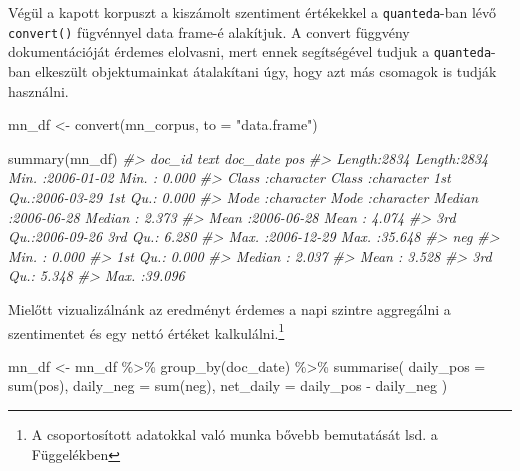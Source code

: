 \documentclass[
]{book}
\newenvironment{Shaded}{\begin{snugshade}}{\end{snugshade}}
\newcommand{\AttributeTok}[1]{\textcolor[rgb]{0.77,0.63,0.00}{#1}}
\newcommand{\CommentTok}[1]{\textcolor[rgb]{0.56,0.35,0.01}{\textit{#1}}}
\newcommand{\FunctionTok}[1]{\textcolor[rgb]{0.00,0.00,0.00}{#1}}
\newcommand{\NormalTok}[1]{#1}
\newcommand{\OtherTok}[1]{\textcolor[rgb]{0.56,0.35,0.01}{#1}}
\newcommand{\SpecialCharTok}[1]{\textcolor[rgb]{0.00,0.00,0.00}{#1}}
\newcommand{\StringTok}[1]{\textcolor[rgb]{0.31,0.60,0.02}{#1}}
\begin{document}
Végül a kapott korpuszt a kiszámolt szentiment értékekkel a
\texttt{quanteda}-ban lévő \texttt{convert()} fügvénnyel data frame-é
alakítjuk. A convert függvény dokumentációját érdemes elolvasni, mert
ennek segítségével tudjuk a \texttt{quanteda}-ban elkeszült
objektumainkat átalakítani úgy, hogy azt más csomagok is tudják
használni.

\begin{Shaded}
\begin{Highlighting}[]
\NormalTok{mn\_df }\OtherTok{\textless{}{-}} \FunctionTok{convert}\NormalTok{(mn\_corpus, }\AttributeTok{to =} \StringTok{"data.frame"}\NormalTok{)}


\FunctionTok{summary}\NormalTok{(mn\_df)}
\CommentTok{\#\textgreater{}     doc\_id              text              doc\_date               pos        }
\CommentTok{\#\textgreater{}  Length:2834        Length:2834        Min.   :2006{-}01{-}02   Min.   : 0.000  }
\CommentTok{\#\textgreater{}  Class :character   Class :character   1st Qu.:2006{-}03{-}29   1st Qu.: 0.000  }
\CommentTok{\#\textgreater{}  Mode  :character   Mode  :character   Median :2006{-}06{-}28   Median : 2.373  }
\CommentTok{\#\textgreater{}                                        Mean   :2006{-}06{-}28   Mean   : 4.074  }
\CommentTok{\#\textgreater{}                                        3rd Qu.:2006{-}09{-}26   3rd Qu.: 6.280  }
\CommentTok{\#\textgreater{}                                        Max.   :2006{-}12{-}29   Max.   :35.648  }
\CommentTok{\#\textgreater{}       neg        }
\CommentTok{\#\textgreater{}  Min.   : 0.000  }
\CommentTok{\#\textgreater{}  1st Qu.: 0.000  }
\CommentTok{\#\textgreater{}  Median : 2.037  }
\CommentTok{\#\textgreater{}  Mean   : 3.528  }
\CommentTok{\#\textgreater{}  3rd Qu.: 5.348  }
\CommentTok{\#\textgreater{}  Max.   :39.096}
\end{Highlighting}
\end{Shaded}

Mielőtt vizualizálnánk az eredményt érdemes a napi szintre aggregálni a
szentimentet és egy nettó értéket kalkulálni.\footnote{A csoportosított
  adatokkal való munka bővebb bemutatását lsd. a Függelékben}

\begin{Shaded}
\begin{Highlighting}[]
\NormalTok{mn\_df }\OtherTok{\textless{}{-}}\NormalTok{ mn\_df }\SpecialCharTok{\%\textgreater{}\%}
  \FunctionTok{group\_by}\NormalTok{(doc\_date) }\SpecialCharTok{\%\textgreater{}\%}
  \FunctionTok{summarise}\NormalTok{(}
    \AttributeTok{daily\_pos =} \FunctionTok{sum}\NormalTok{(pos),}
    \AttributeTok{daily\_neg =} \FunctionTok{sum}\NormalTok{(neg),}
    \AttributeTok{net\_daily =}\NormalTok{ daily\_pos }\SpecialCharTok{{-}}\NormalTok{ daily\_neg}
\NormalTok{  )}
\end{Highlighting}
\end{Shaded}
\end{document}
